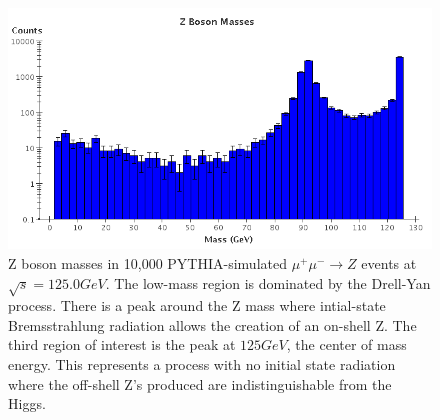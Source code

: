 \documentclass[a4paper]{article}
\begin{document}
\begin{figure}[h]
	\centering
	\includegraphics[width=\textwidth]{z-masses}
	\caption{Z boson masses in 10,000 PYTHIA-simulated $\mu^+\mu^-\rightarrow Z$ events at $\sqrt{s}=125.0GeV$. The low-mass region is dominated by the Drell-Yan process. There is a peak around the Z mass where intial-state Bremsstrahlung radiation allows the creation of an on-shell Z. The third region of interest is the peak at $125GeV$, the center of mass energy. This represents a process with no initial state radiation where the off-shell Z's produced are indistinguishable from the Higgs.}
\label{z-mass-plot}
\end{figure}
\end{document}
